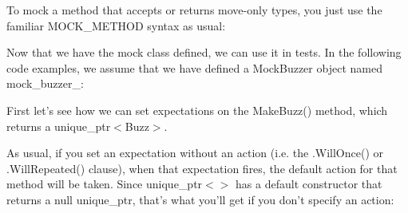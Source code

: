 To mock a method that accepts or returns move-\/only types, you just use the familiar {\ttfamily M\+O\+C\+K\+\_\+\+M\+E\+T\+H\+OD} syntax as usual\+:


\begin{DoxyCode}{0}
\DoxyCodeLine{ \textcolor{keyword}{public}:}
\DoxyCodeLine{\};}
\end{DoxyCode}


Now that we have the mock class defined, we can use it in tests. In the following code examples, we assume that we have defined a {\ttfamily Mock\+Buzzer} object named {\ttfamily mock\+\_\+buzzer\+\_\+}\+:


\begin{DoxyCode}{0}
\end{DoxyCode}


First let’s see how we can set expectations on the {\ttfamily Make\+Buzz()} method, which returns a {\ttfamily unique\+\_\+ptr$<$Buzz$>$}.

As usual, if you set an expectation without an action (i.\+e. the {\ttfamily .Will\+Once()} or {\ttfamily .Will\+Repeated()} clause), when that expectation fires, the default action for that method will be taken. Since {\ttfamily unique\+\_\+ptr$<$$>$} has a default constructor that returns a null {\ttfamily unique\+\_\+ptr}, that’s what you’ll get if you don’t specify an action\+:


\begin{DoxyCode}{0}
\DoxyCodeLine{\textcolor{comment}{// Use the default action.}}
\DoxyCodeLine{}
\DoxyCodeLine{\textcolor{comment}{// Triggers the previous EXPECT\_CALL.}}
\end{DoxyCode}


